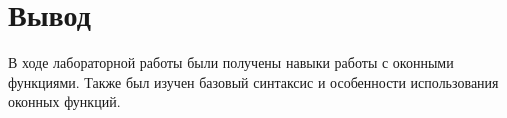 \section*{Вывод}

В ходе лабораторной работы были получены навыки работы с оконными функциями. Также был изучен базовый синтаксис и особенности использования оконных функций.
